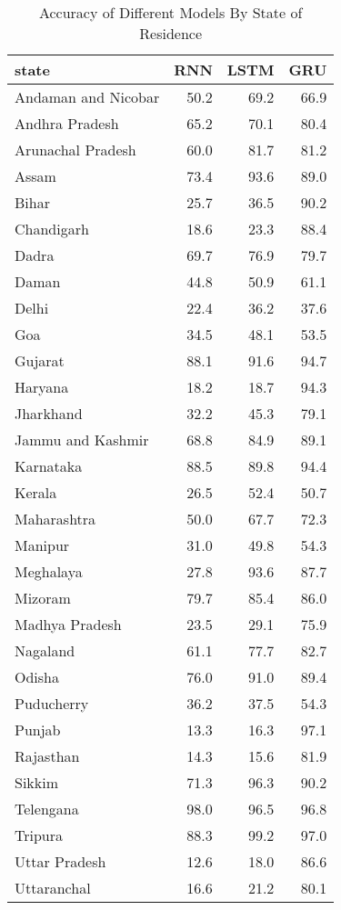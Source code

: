 \begin{table}
\centering
\caption{Accuracy of Different Models By State of Residence}
\label{accuracy_by_state}
\begin{tabular}{lrrr}
\toprule
state & RNN & LSTM & GRU \\
\midrule
Andaman and Nicobar & 50.2 & 69.2 & 66.9 \\
Andhra Pradesh & 65.2 & 70.1 & 80.4 \\
Arunachal Pradesh & 60.0 & 81.7 & 81.2 \\
Assam & 73.4 & 93.6 & 89.0 \\
Bihar & 25.7 & 36.5 & 90.2 \\
Chandigarh & 18.6 & 23.3 & 88.4 \\
Dadra & 69.7 & 76.9 & 79.7 \\
Daman & 44.8 & 50.9 & 61.1 \\
Delhi & 22.4 & 36.2 & 37.6 \\
Goa & 34.5 & 48.1 & 53.5 \\
Gujarat & 88.1 & 91.6 & 94.7 \\
Haryana & 18.2 & 18.7 & 94.3 \\
Jharkhand & 32.2 & 45.3 & 79.1 \\
Jammu and Kashmir & 68.8 & 84.9 & 89.1 \\
Karnataka & 88.5 & 89.8 & 94.4 \\
Kerala & 26.5 & 52.4 & 50.7 \\
Maharashtra & 50.0 & 67.7 & 72.3 \\
Manipur & 31.0 & 49.8 & 54.3 \\
Meghalaya & 27.8 & 93.6 & 87.7 \\
Mizoram & 79.7 & 85.4 & 86.0 \\
Madhya Pradesh & 23.5 & 29.1 & 75.9 \\
Nagaland & 61.1 & 77.7 & 82.7 \\
Odisha & 76.0 & 91.0 & 89.4 \\
Puducherry & 36.2 & 37.5 & 54.3 \\
Punjab & 13.3 & 16.3 & 97.1 \\
Rajasthan & 14.3 & 15.6 & 81.9 \\
Sikkim & 71.3 & 96.3 & 90.2 \\
Telengana & 98.0 & 96.5 & 96.8 \\
Tripura & 88.3 & 99.2 & 97.0 \\
Uttar Pradesh & 12.6 & 18.0 & 86.6 \\
Uttaranchal & 16.6 & 21.2 & 80.1 \\
\bottomrule
\end{tabular}
\end{table}
